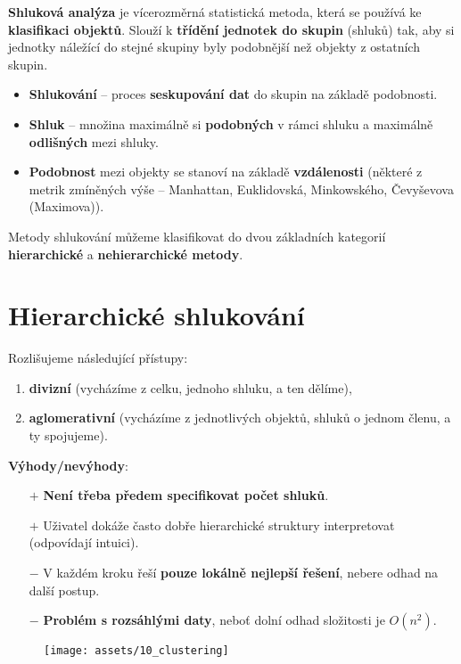 \textbf{Shluková analýza} je vícerozměrná statistická metoda, která se používá ke \textbf{klasifikaci objektů}. Slouží k \textbf{třídění jednotek do skupin} (shluků) tak, aby si jednotky náležící do stejné skupiny byly podobnější než objekty z ostatních skupin.
\begin{itemize}
    \item \textbf{Shlukování} -- proces \textbf{seskupování dat} do skupin na základě podobnosti.
    \item \textbf{Shluk} -- množina maximálně si \textbf{podobných} v rámci shluku a maximálně \textbf{odlišných} mezi shluky.
    \item \textbf{Podobnost} mezi objekty se stanoví na základě \textbf{vzdálenosti} (některé z metrik zmíněných výše -- Manhattan, Euklidovská, Minkowského, Čevyševova (Maximova)).
\end{itemize}

Metody shlukování můžeme klasifikovat do dvou základních kategorií \textbf{hierarchické} a \textbf{nehierarchické metody}.

\section{Hierarchické shlukování}
Rozlišujeme následující přístupy:
\begin{enumerate}
    \item \textbf{divizní} (vycházíme z celku, jednoho shluku, a ten dělíme),
    \item \textbf{aglomerativní} (vycházíme z jednotlivých objektů, shluků o jednom členu, a ty spojujeme).
\end{enumerate}

\noindent \textbf{Výhody/nevýhody}:
\begin{itemize}
    \item[$+$] \textbf{Není třeba předem specifikovat počet shluků}.
    \item[$+$] Uživatel dokáže často dobře hierarchické struktury interpretovat (odpovídají intuici).
    \item[$-$] V každém kroku řeší \textbf{pouze lokálně nejlepší řešení}, nebere odhad na další postup.
    \item[$-$] \textbf{Problém s rozsáhlými daty}, neboť dolní odhad složitosti je $O(n^2)$.
\end{itemize}

\begin{figure}[H]
    \centering
    \texttt{[image: assets/10\_clustering]}
\end{figure}

